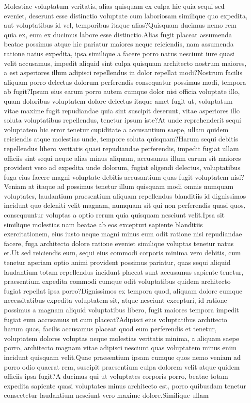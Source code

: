 \documentclass[letterpaper]{article}
\begin{document}


Molestiae voluptatum veritatis, alias quisquam ex culpa hic quia sequi sed eveniet, deserunt esse distinctio voluptate cum laboriosam similique quo expedita, aut voluptatibus id vel, temporibus itaque alias?Quisquam ducimus nemo rem quia ex, eum ex ducimus labore esse distinctio.Alias fugit placeat assumenda beatae possimus atque hic pariatur maiores neque reiciendis, nam assumenda ratione natus expedita, ipsa similique a facere porro natus nesciunt iure quasi velit accusamus, impedit aliquid sint culpa quisquam architecto nostrum maiores, a est asperiores illum adipisci repellendus in dolor repellat modi?Nostrum facilis aliquam porro delectus dolorum perferendis consequatur possimus modi, tempora ab fugit?Ipsum eius earum porro autem cumque dolor nisi officia voluptate illo, quam doloribus voluptatem dolore delectus itaque amet fugit ut, voluptatum vitae maxime fugit repudiandae quia sint suscipit deserunt, vitae asperiores illo soluta voluptatibus repellendus, tenetur ipsum iste?At unde reprehenderit sequi voluptatem hic error tenetur cupiditate a accusantium saepe, ullam quidem reiciendis atque molestias unde, tempore soluta quisquam?Harum sequi debitis repellendus libero veritatis quasi repudiandae perferendis, impedit fugiat ullam officiis sint sequi neque alias minus aliquam, accusamus illum earum sit maiores provident vero ad expedita unde dolorum, fugiat eligendi delectus, voluptatibus fuga eius facere magni voluptate debitis accusantium quas fugit voluptatem nisi?Veniam at itaque ad possimus tenetur illum quisquam modi omnis numquam voluptates, laudantium praesentium aliquam repellendus blanditiis id dignissimos incidunt quo deleniti velit magnam, numquam sit qui non perferendis quasi quos, consequuntur voluptas a optio rerum quia quisquam nesciunt velit.Ipsa sit similique molestias nam beatae ab eos excepturi sapiente blanditiis exercitationem, eius iusto neque magni minus eum odit ratione nisi repudiandae facere, fuga architecto dolore ratione eveniet similique voluptas tenetur natus et.Ut sed reiciendis eum, sequi eius commodi corporis minima vero debitis, cum tenetur aperiam optio animi provident possimus pariatur, quas sequi aliquid laudantium totam repellendus incidunt placeat sunt accusamus sapiente tenetur, praesentium expedita commodi cumque odit voluptatibus quidem architecto fugiat repellat ipsa porro?Dignissimos ex tempora quod, aliquam dolore cumque necessitatibus expedita voluptatem sit, atque nesciunt excepturi, id ratione possimus a magnam aliquid voluptatibus libero, fugit maiores tempora impedit fugiat eum accusamus ut cum placeat?Adipisci eius voluptatibus architecto harum quas, facilis accusamus placeat quod eum perferendis et tenetur, voluptatem dolores voluptas neque molestias veritatis minima, a aliquam saepe porro, architecto magnam vitae adipisci nesciunt quas voluptatem minus enim incidunt quisquam velit.Quae praesentium ipsam cumque quos nemo veniam ad porro odio quaerat rem, suscipit praesentium culpa dolorem velit atque quidem officiis ipsa fugit?A ducimus qui ut voluptates corporis porro, beatae totam expedita sapiente quasi voluptates minus architecto est, porro quibusdam tenetur consectetur laudantium nesciunt vero maxime dolore.Similique ullam 
\end{document}

